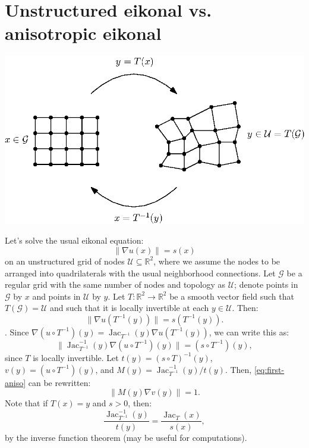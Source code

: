 \documentclass{article}
\newcommand{\Jac}{\operatorname{Jac}}
\begin{document}
\section*{Unstructured eikonal vs. anisotropic eikonal}

\begin{center}
  \includegraphics{grids.eps}
\end{center}

Let's solve the usual eikonal equation:
\begin{equation}
  \label{eq:eikonal}
  \|\nabla u(x)\| = s(x)
\end{equation}
on an unstructured grid of nodes $\mathcal{U} \subseteq \mathbb{R}^2$,
where we assume the nodes to be arranged into quadrilaterals with the
usual neighborhood connections. Let $\mathcal{G}$ be a regular grid
with the same number of nodes and topology as $\mathcal{U}$; denote
points in $\mathcal{G}$ by $x$ and points in $\mathcal{U}$ by $y$. Let
$T : \mathbb{R}^2 \to \mathbb{R}^2$ be a smooth vector field such that
$T(\mathcal{G}) = \mathcal{U}$ and such that it is locally invertible
at each $y \in \mathcal{U}$. Then:
\begin{equation}
  \| \nabla u(T^{-1}(y)) \| = s(T^{-1}(y)).
\end{equation}.
Since $\nabla (u \circ T^{-1}) (y) = \Jac_{T^{-1}}(y) \nabla u(T^{-1}(y))$, we can write this as:
\begin{equation}\label{eq:first-aniso}
  \| \Jac_{T^{-1}}^{-1}(y) \nabla (u \circ T^{-1}) (y) \| = (s \circ T^{-1})(y),
\end{equation}
since $T$ is locally invertible. Let $t(y) = (s \circ T)^{-1}(y)$,
$v(y) = (u \circ T^{-1}) (y)$, and $M(y) =
\Jac_{T^{-1}}^{-1}(y)/t(y)$. Then, \cref{eq:first-aniso} can be rewritten:
\begin{equation}
  \| M(y) \nabla v(y) \| = 1.
\end{equation}
Note that if $T(x) = y$ and $s > 0$, then:
\begin{equation}
  \frac{\Jac^{-1}_{T^{-1}}(y)}{t(y)} = \frac{\Jac_T(x)}{s(x)},
\end{equation}
by the inverse function theorem (may be useful for computations).
\end{document}
